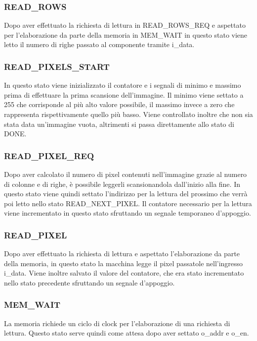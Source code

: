 \documentclass{article}
\begin{document}
\subsubsection{READ\_ROWS}
Dopo aver effettuato la richiesta di lettura in READ\_ROWS\_REQ e aspettato per l'elaborazione da parte della memoria in MEM\_WAIT in questo stato viene letto il numero di righe passato al componente tramite i\_data.

\subsubsection{READ\_PIXELS\_START}
In questo stato viene inizializzato il contatore  e i segnali di minimo e massimo prima di effettuare la prima scansione dell'immagine. Il minimo viene settato a 255 che corrisponde al più alto valore possibile, il massimo invece a zero che rappresenta rispettivamente quello più basso. Viene controllato inoltre che non sia stata data un'immagine vuota, altrimenti si passa direttamente allo stato di DONE.

\subsubsection{READ\_PIXEL\_REQ}
Dopo aver calcolato il numero di pixel contenuti nell'immagine grazie al numero di colonne e di righe, è possibile leggerli scansionandola dall'inizio alla fine. In questo stato viene quindi settato l'indirizzo per la lettura del prossimo che verrà poi letto nello stato READ\_NEXT\_PIXEL. Il contatore necessario per la lettura viene incrementato in questo stato sfruttando un segnale temporaneo d'appoggio.

\subsubsection{READ\_PIXEL}
Dopo aver effettuato la richiesta di lettura e aspettato l'elaborazione da parte della memoria, in questo stato la macchina legge il pixel passatole nell'ingresso i\_data. Viene inoltre salvato il valore del contatore, che era stato incrementato nello stato precedente sfruttando un segnale d'appoggio.

\subsubsection{MEM\_WAIT}
La memoria richiede un ciclo di clock per l'elaborazione di una richiesta di lettura. Questo stato serve quindi come attesa dopo aver settato o\_addr e o\_en.
\end{document}
